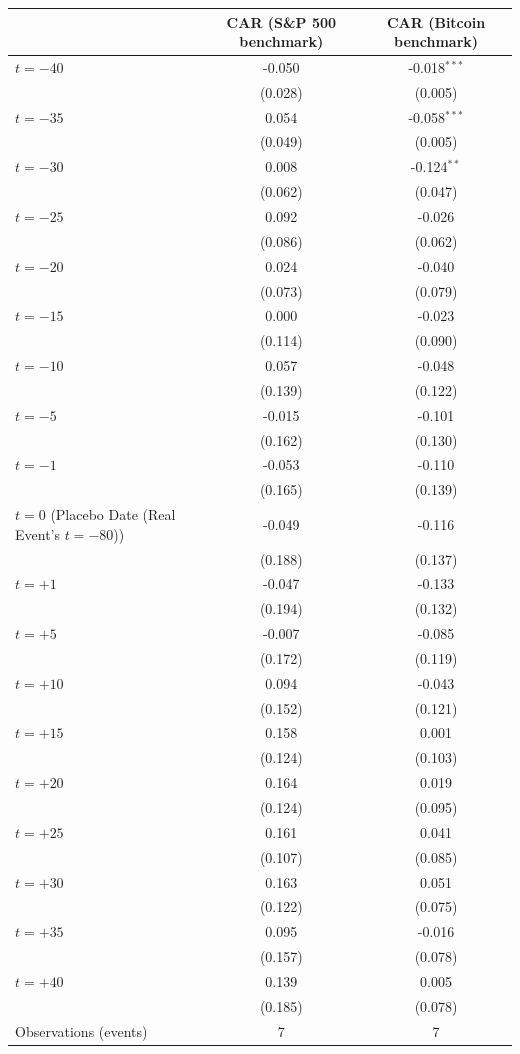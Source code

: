 \begin{tabular}{lcc}
\toprule
 & CAR (S\&P 500 benchmark) & CAR (Bitcoin benchmark) \\
\midrule
\quad $t=-40$ & -0.050 & -0.018$^{***}$ \\
 & (0.028) & (0.005) \\
\quad $t=-35$ & 0.054 & -0.058$^{***}$ \\
 & (0.049) & (0.005) \\
\quad $t=-30$ & 0.008 & -0.124$^{**}$ \\
 & (0.062) & (0.047) \\
\quad $t=-25$ & 0.092 & -0.026 \\
 & (0.086) & (0.062) \\
\quad $t=-20$ & 0.024 & -0.040 \\
 & (0.073) & (0.079) \\
\quad $t=-15$ & 0.000 & -0.023 \\
 & (0.114) & (0.090) \\
\quad $t=-10$ & 0.057 & -0.048 \\
 & (0.139) & (0.122) \\
\quad $t=-5$ & -0.015 & -0.101 \\
 & (0.162) & (0.130) \\
\quad $t=-1$ & -0.053 & -0.110 \\
 & (0.165) & (0.139) \\
\quad $t=0$ (Placebo Date (Real Event's $t=-80$)) & -0.049 & -0.116 \\
 & (0.188) & (0.137) \\
\quad $t=+1$ & -0.047 & -0.133 \\
 & (0.194) & (0.132) \\
\quad $t=+5$ & -0.007 & -0.085 \\
 & (0.172) & (0.119) \\
\quad $t=+10$ & 0.094 & -0.043 \\
 & (0.152) & (0.121) \\
\quad $t=+15$ & 0.158 & 0.001 \\
 & (0.124) & (0.103) \\
\quad $t=+20$ & 0.164 & 0.019 \\
 & (0.124) & (0.095) \\
\quad $t=+25$ & 0.161 & 0.041 \\
 & (0.107) & (0.085) \\
\quad $t=+30$ & 0.163 & 0.051 \\
 & (0.122) & (0.075) \\
\quad $t=+35$ & 0.095 & -0.016 \\
 & (0.157) & (0.078) \\
\quad $t=+40$ & 0.139 & 0.005 \\
 & (0.185) & (0.078) \\
\midrule
Observations (events) & 7 & 7 \\
\bottomrule
\end{tabular}
